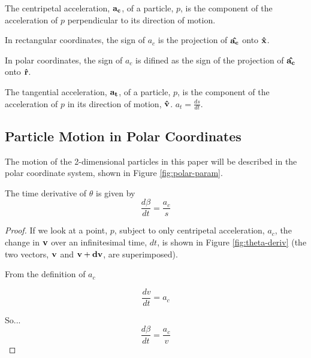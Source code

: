 \begin{definition}
  The centripetal acceleration, $\mathbf{a_c}$, of a particle, $p$, is the component of the acceleration of $p$ perpendicular to its direction of motion.

  In rectangular coordinates, the sign of $a_c$ is the projection of $\mathbf{\hat{a_c}}$ onto $\mathbf{\hat{x}}$. 

  In polar coordinates, the sign of $a_c$ is difined as the sign of the projection of $\mathbf{\hat{a_c}}$ onto $\mathbf{\hat{r}}$.
\end{definition}

\begin{definition}
  The tangential acceleration, $\mathbf{a_t}$, of a particle, $p$, is the component of the acceleration of $p$ in its direction of motion, $\mathbf{\hat{v}}$. $a_t = \frac{ds}{dt}$.
\end{definition}


\subsection{Particle Motion in Polar Coordinates}

The motion of the 2-dimensional particles in this paper will be described in the polar coordinate system, shown in Figure \ref{fig:polar-param}.


\begin{lemma}
The time derivative of $\theta$ is given by
\[
\frac{d\beta}{dt} = \frac{a_c}{s}
\]
\end{lemma}

\begin{proof}

If we look at a point, $p$, subject to only centripetal acceleration, $a_c$, the change in $\mathbf{v}$ over an infinitesimal time, $dt$, is shown in Figure \ref{fig:theta-deriv} (the two vectors, $\mathbf{v}$ and $\mathbf{v}+\mathbf{dv}$, are superimposed). 


From the definition of $a_c$

\[
\frac{dv}{dt} = a_c
\]

So...
\[
\frac{d\beta}{dt} = \frac{a_c}{v}
\]
\end{proof}

